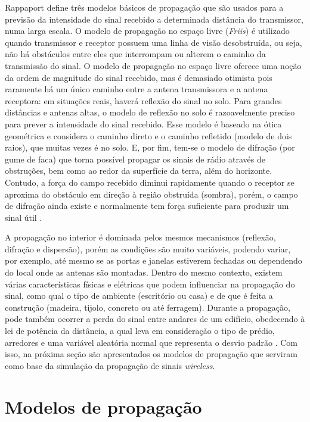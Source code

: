 \documentclass[
	12pt,				%
	twoside,			%
	a4paper,			%
	english,			%
	french,				%
	spanish,			%
	brazil				%
	]{abntex2}
\begin{document}
Rappaport define três modelos básicos de propagação que são usados para
a previsão da intensidade do sinal recebido a determinada distância do
transmissor, numa larga escala. O modelo de propagação no espaço livre
(\emph{Friis}) é utilizado quando transmissor e receptor possuem uma
linha de visão desobstruída, ou seja, não há obstáculos entre eles que
interrompam ou alterem o caminho da transmissão do sinal. O modelo de
propagação no espaço livre oferece uma noção da ordem de magnitude do
sinal recebido, mas é demasiado otimista pois raramente há um único
caminho entre a antena transmissora e a antena receptora: em situações
reais, haverá reflexão do sinal no solo. Para grandes distâncias e
antenas altas, o modelo de reflexão no solo é razoavelmente preciso para
prever a intensidade do sinal recebido. Esse modelo é baseado na ótica
geométrica e considera o caminho direto e o caminho refletido (modelo de
dois raios), que muitas vezes é no solo. E, por fim, tem-se o modelo de
difração (por gume de faca) que torna possível propagar os sinais de
rádio através de obstruções, bem como ao redor da superfície da terra,
além do horizonte. Contudo, a força do campo recebido diminui
rapidamente quando o receptor se aproxima do obstáculo em direção à
região obstruída (sombra), porém, o campo de difração ainda existe e
normalmente tem força suficiente para produzir um sinal útil
\cite[p. 72-83]{RAPPAPORT}.

A propagação no interior é dominada pelos mesmos mecanismos (reflexão,
difração e dispersão), porém as condições são muito variáveis, podendo
variar, por exemplo, até mesmo se as portas e janelas estiverem fechadas
ou dependendo do local onde as antenas são montadas. Dentro do mesmo
contexto, existem várias características físicas e elétricas que podem
influenciar na propagação do sinal, como qual o tipo de ambiente
(escritório ou casa) e de que é feita a construção (madeira, tijolo,
concreto ou até ferragem). Durante a propagação, pode também ocorrer a
perda do sinal entre andares de um edifício, obedecendo à lei de
potência da distância, a qual leva em consideração o tipo de prédio,
arredores e uma variável aleatória normal que representa o desvio padrão
\cite[p. 104-108]{RAPPAPORT}. Com isso, na próxima seção são
apresentados os modelos de propagação que serviram como base da
simulação da propagação de sinais \emph{wireless}.

\section{Modelos de propagação}\label{sec:modelos}
\end{document}
